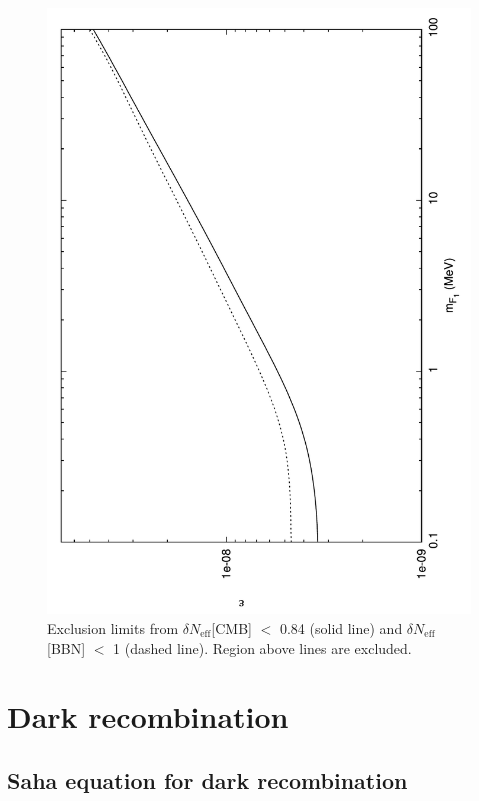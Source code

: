 \documentclass[12pt]{article}
\begin{document}
\begin{figure}[htpb]
    \centering
        \includegraphics[scale=0.5, angle=270]{fig10}
    \caption{Exclusion limits from $\delta N _{\text{eff}}$[CMB] $<$ 0.84 (solid line) and $\delta N _{\text{eff}}$[BBN] $<$ 1 (dashed line). Region above lines are excluded.}
    \label{fig:Comparison bbn cmb}
\end{figure}
%

\newpage

\section{Dark recombination}

\subsection{Saha equation for dark recombination}
\end{document}
